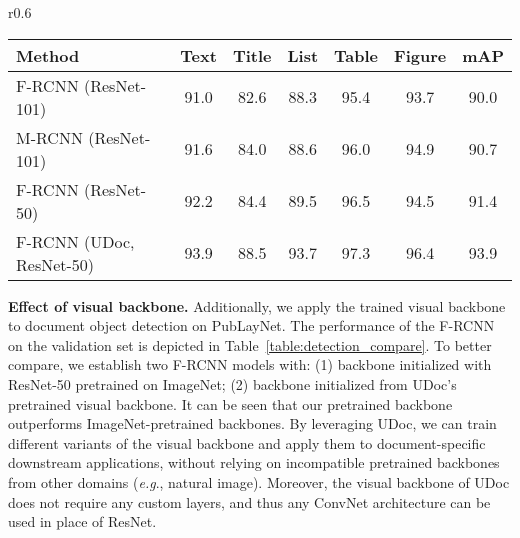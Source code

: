 \documentclass{article}
\def\eg{\emph{e.g}.}
\begin{document}
	\begin{wraptable}{r}{0.6\textwidth}
		\vspace{-4mm}
		\small
		\caption{MAP @ IOU [0.50:0.95] of the document detection models on PubLayNet dev set.}
		\vspace{-2mm}
		\setlength{\tabcolsep}{1.5pt}
		{
			\begin{tabular}{l|cccccc}
				\toprule
				Method &Text & Title & List & Table & Figure& mAP \\
				\hline
				F-RCNN (ResNet-101)~\cite{zhong2019publaynet} & 91.0 & 82.6 & 88.3 & 95.4 & 93.7 & 90.0 \\
				M-RCNN (ResNet-101)~\cite{zhong2019publaynet} & 91.6 & 84.0 & 88.6 & 96.0 & 94.9 & 90.7 \\
				\hline
				F-RCNN (ResNet-50) &  92.2 & 84.4 & 89.5 & 96.5 & 94.5 & 91.4 \\
				F-RCNN (UDoc, ResNet-50) & 93.9  & 88.5 & 93.7 & 97.3 & 96.4 & 93.9 \\
				\bottomrule
			\end{tabular}
		} 
		\label{table:detection_compare}
		\vspace{-3mm}
	\end{wraptable}
	
	\vspace{1mm}
	\noindent\textbf{Effect of visual backbone.}
	{Additionally,} we apply the trained visual backbone to document {object} detection on PubLayNet. The performance of the F-RCNN on {the validation set} is depicted in Table~\ref{table:detection_compare}. To better {compare}, we {establish} two {F-RCNN models with}: (1) {backbone initialized with ResNet-50 pretrained on ImageNet;} (2) {backbone initialized from UDoc's pretrained visual backbone.} {It can be seen that our pretrained backbone outperforms ImageNet-pretrained backbones.} {By leveraging UDoc}, we can train different variants of the visual backbone and apply them {to document-specific} downstream applications, { without relying on incompatible pretrained backbones from other domains (\eg, natural image).} {Moreover, the visual backbone of UDoc {does not} require any {custom} layers, and thus {any ConvNet architecture can be used in place of ResNet.}}
	
\end{document}
